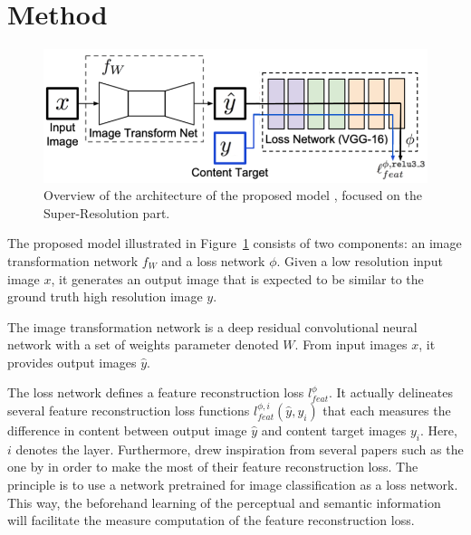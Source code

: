 \documentclass{article}
\begin{document}
{
    \section{Method}
    \label{sec:method}

    \begin{figure}[ht]
        \centering
        \includegraphics[width=\textwidth]{images/model.png}
        \caption{Overview of the architecture of the proposed model \citep{sr}, focused on the Super-Resolution part.}
        \label{fig:model}
    \end{figure}

    The proposed model illustrated in Figure~\ref{fig:model} consists of two components: an image transformation network $f_W$ and a loss network $\phi$. Given a low resolution input image $x$, it generates an output image that is expected to be similar to the ground truth high resolution image $y$.

    The image transformation network is a deep residual convolutional neural network with a set of weights parameter denoted $W$. From input images $x$, it provides output images $\hat y$.

    The loss network defines a feature reconstruction loss $l^\phi_{feat}$. It actually delineates several feature reconstruction loss functions $l^{\phi, i}_{feat}(\hat y, y_i)$ that each measures the difference in content between output image $\hat y$ and content target images $y_i$. Here, $i$ denotes the layer.
    Furthermore, \cite{sr} drew inspiration from several papers such as the one by \cite{gatys} in order to make the most of their feature reconstruction loss. The principle is to use a network pretrained for image classification as a loss network. This way, the beforehand learning of the perceptual and semantic information will facilitate the measure computation of the feature reconstruction loss.

}
\end{document}
